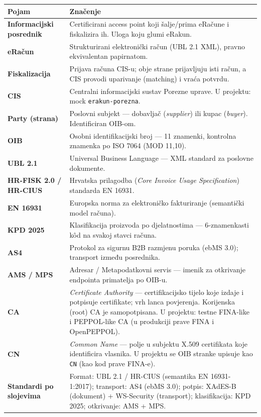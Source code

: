 \documentclass[11pt,a4paper]{article}
\begin{document}
\begin{tabularx}{\textwidth}{@{}lY@{}}
\toprule
\textbf{Pojam} & \textbf{Značenje} \\
\midrule
\textbf{Informacijski posrednik} & Certificirani access point koji šalje/prima eRačune i fiskalizira ih. Uloga koju glumi eRakun. \\
\textbf{eRačun} & Strukturirani elektronički račun (UBL 2.1 XML), pravno ekvivalentan papirnatom. \\
\textbf{Fiskalizacija} & Prijava računa CIS-u; obje strane prijavljuju isti račun, a CIS provodi uparivanje (matching) i vraća potvrdu. \\
\textbf{CIS} & Centralni informacijski sustav Porezne uprave. U projektu: mock \texttt{erakun-porezna}. \\
\textbf{Party (strana)} & Poslovni subjekt — dobavljač (\textit{supplier}) ili kupac (\textit{buyer}). Identificiran OIB-om. \\
\textbf{OIB} & Osobni identifikacijski broj — 11 znamenki, kontrolna znamenka po ISO 7064 (MOD 11,10). \\
\textbf{UBL 2.1} & Universal Business Language — XML standard za poslovne dokumente. \\
\textbf{HR-FISK 2.0 / HR-CIUS} & Hrvatska prilagodba (\textit{Core Invoice Usage Specification}) standarda EN 16931. \\
\textbf{EN 16931} & Europska norma za elektroničko fakturiranje (semantički model računa). \\
\textbf{KPD 2025} & Klasifikacija proizvoda po djelatnostima — 6-znamenkasti kôd na svakoj stavci računa. \\
\textbf{AS4} & Protokol za sigurnu B2B razmjenu poruka (ebMS 3.0); transport između posrednika. \\
\textbf{AMS / MPS} & Adresar / Metapodatkovni servis — imenik za otkrivanje endpointa primatelja po OIB-u. \\
\textbf{CA} & \textit{Certificate Authority} — certifikacijsko tijelo koje izdaje i potpisuje certifikate; vrh lanca povjerenja. Korijenska (root) CA je samopotpisana. U projektu: testne FINA-like i PEPPOL-like CA (u produkciji prave FINA i OpenPEPPOL). \\
\textbf{CN} & \textit{Common Name} — polje u subjektu X.509 certifikata koje identificira vlasnika. U projektu se OIB stranke upisuje kao \texttt{CN} (kao kod prave FINA-e). \\
\midrule
\textbf{Standardi po slojevima} & Format: UBL 2.1 / HR-CIUS (semantika EN 16931-1:2017); transport: AS4 (ebMS 3.0); potpis: XAdES-B (dokument) + WS-Security (transport); klasifikacija: KPD 2025; otkrivanje: AMS + MPS. \\
\bottomrule
\end{tabularx}
\end{document}
